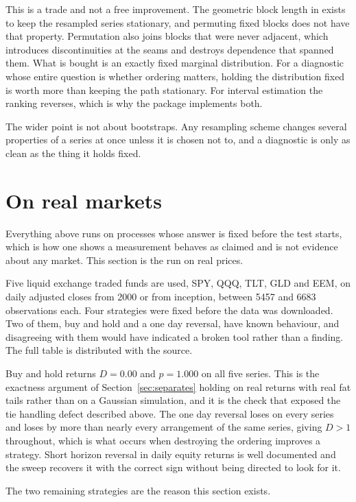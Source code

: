 \documentclass[11pt]{article}
\begin{document}
This is a trade and not a free improvement. The geometric block length in
\citet{politis1994stationary} exists to keep the resampled series stationary, and
permuting fixed blocks does not have that property. Permutation also joins blocks
that were never adjacent, which introduces discontinuities at the seams and
destroys dependence that spanned them. What is bought is an exactly fixed
marginal distribution. For a diagnostic whose entire question is whether
ordering matters, holding the distribution fixed is worth more than keeping the
path stationary. For interval estimation the ranking reverses, which is why the
package implements both.

The wider point is not about bootstraps. Any resampling scheme changes several
properties of a series at once unless it is chosen not to, and a diagnostic is
only as clean as the thing it holds fixed.

\section{On real markets}\label{sec:real}

Everything above runs on processes whose answer is fixed before the test starts, which is how one shows a measurement behaves as claimed and is not evidence about any market. This section is the run on real prices.

Five liquid exchange traded funds are used, SPY, QQQ, TLT, GLD and EEM, on daily adjusted closes from 2000 or from inception, between 5457 and 6683 observations each. Four strategies were fixed before the data was downloaded. Two of them, buy and hold and a one day reversal, have known behaviour, and disagreeing with them would have indicated a broken tool rather than a finding. The full table is distributed with the source.

Buy and hold returns $D = 0.00$ and $p = 1.000$ on all five series. This is the exactness argument of Section~\ref{sec:separates} holding on real returns with real fat tails rather than on a Gaussian simulation, and it is the check that exposed the tie handling defect described above. The one day reversal loses on every series and loses by more than nearly every arrangement of the same series, giving $D > 1$ throughout, which is what occurs when destroying the ordering improves a strategy. Short horizon reversal in daily equity returns is well documented and the sweep recovers it with the correct sign without being directed to look for it.

The two remaining strategies are the reason this section exists.
\end{document}
